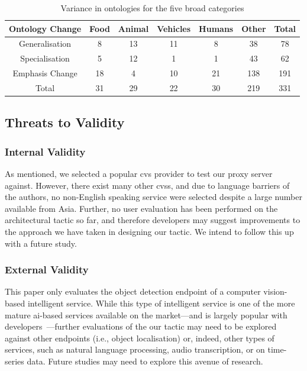 
\begin{table}[]
    \centering
    \caption{Variance in ontologies for the five broad categories}
    \label{tab:ontology-variance}
    \begin{tabular}{c|ccccc|c}
        \toprule
        \textbf{Ontology Change}
        & \textbf{Food}
        & \textbf{Animal} 
        & \textbf{Vehicles} 
        & \textbf{Humans} 
        & \textbf{Other} 
        & \textbf{Total}\\
        \midrule
        Generalisation & 8&13&11&8&38&78\\
        Specialisation & 5&12&1&1&43&62\\
        Emphasis Change & 18&4&10&21&138&191\\
        \midrule
        Total & 31&29&22&30&219&331\\
        \bottomrule
    \end{tabular}
\end{table}

\subsection{Threats to Validity}
\label{sec:threats}

\subsubsection{Internal Validity} As mentioned, we selected a popular \gls{cvs} provider to test our proxy server against. However, there exist many other \glspl{cvs}, and due to language barriers of the authors, no non-English speaking service were selected despite a large number available from Asia. Further, no user evaluation has been performed on the architectural tactic so far, and therefore developers may suggest improvements to the approach we have taken in designing our tactic. We intend to follow this up with a future study.

\subsubsection{External Validity}
This paper only evaluates the object detection endpoint of a computer vision-based intelligent service. While this type of intelligent service is one of the more mature \gls{ai}-based services available on the market---and is largely popular with developers~\citep{Cummaudo:2020icse}---further evaluations of the our tactic may need to be explored against other endpoints (i.e., object localisation) or, indeed, other types of services, such as natural language processing, audio transcription, or on time-series data. Future studies may need to explore this avenue of research.

